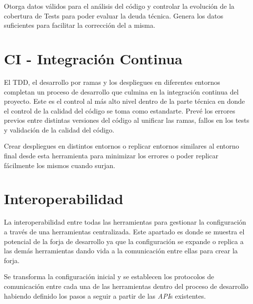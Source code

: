 \par Otorga datos válidos para el análisis del código y controlar la evolución de la cobertura de Tests para poder evaluar la deuda técnica. Genera los datos suficientes para facilitar la corrección del a misma.


\section{CI - Integración Continua}
\label{sec:integracion-continua}

\par El TDD, el desarrollo por ramas y los despliegues en diferentes entornos completan un proceso de desarrollo que culmina en la integración continua del proyecto. Este es el control al más alto nivel dentro de la parte técnica en donde el control de la calidad del código se toma como estandarte. Prevé los errores previos entre distintas versiones del código al unificar las ramas, fallos en los tests y validación de la calidad del código.

\par Crear despliegues en distintos entornos o replicar entornos similares al entorno final desde esta herramienta para minimizar los errores o poder replicar fácilmente los mismos cuando surjan.


\section{Interoperabilidad}
\label{sec:interoperabilidad}

\par La interoperabilidad entre todas las herramientas para gestionar la configuración a través de una herramientas centralizada. Este apartado es donde se muestra el potencial de la forja de desarrollo ya que la configuración se expande o replica a las demás herramientas dando vida a la comunicación entre ellas para crear la forja.

\par Se transforma la configuración inicial y se establecen los protocolos de comunicación entre cada una de las herramientas dentro del proceso de desarrollo habiendo definido los pasos a seguir a partir de las \emph{API}s existentes.


